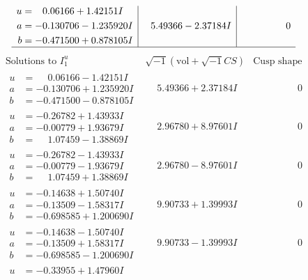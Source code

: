 \documentclass[1p]{elsarticle_modified}
\theoremstyle{definition}
\newcommand{\I}{\sqrt{-1}}
\begin{document}
$$\begin{array}{c|c|c}
\begin{aligned}
u &= \phantom{-}0.06166 + 1.42151 I \\
a &= -0.130706 - 1.235920 I \\
b &= -0.471500 + 0.878105 I\end{aligned}
 & \phantom{-}5.49366 - 2.37184 I & \phantom{-0.000000 } 0\\
 \hline 
 \end{array}$$\newpage$$\begin{array}{c|c|c}  
\text{Solutions to }I^u_{1}& \I (\text{vol} + \sqrt{-1}CS) & \text{Cusp shape}\\
 \hline 
\begin{aligned}
u &= \phantom{-}0.06166 - 1.42151 I \\
a &= -0.130706 + 1.235920 I \\
b &= -0.471500 - 0.878105 I\end{aligned}
 & \phantom{-}5.49366 + 2.37184 I & \phantom{-0.000000 } 0 \\ \hline\begin{aligned}
u &= -0.26782 + 1.43933 I \\
a &= -0.00779 + 1.93679 I \\
b &= \phantom{-}1.07459 - 1.38869 I\end{aligned}
 & \phantom{-}2.96780 + 8.97601 I & \phantom{-0.000000 } 0 \\ \hline\begin{aligned}
u &= -0.26782 - 1.43933 I \\
a &= -0.00779 - 1.93679 I \\
b &= \phantom{-}1.07459 + 1.38869 I\end{aligned}
 & \phantom{-}2.96780 - 8.97601 I & \phantom{-0.000000 } 0 \\ \hline\begin{aligned}
u &= -0.14638 + 1.50740 I \\
a &= -0.13509 - 1.58317 I \\
b &= -0.698585 + 1.200690 I\end{aligned}
 & \phantom{-}9.90733 + 1.39993 I & \phantom{-0.000000 } 0 \\ \hline\begin{aligned}
u &= -0.14638 - 1.50740 I \\
a &= -0.13509 + 1.58317 I \\
b &= -0.698585 - 1.200690 I\end{aligned}
 & \phantom{-}9.90733 - 1.39993 I & \phantom{-0.000000 } 0 \\ \hline\begin{aligned}
u &= -0.33955 + 1.47960 I \\

\end{aligned}
\end{array}$$
\end{document}
